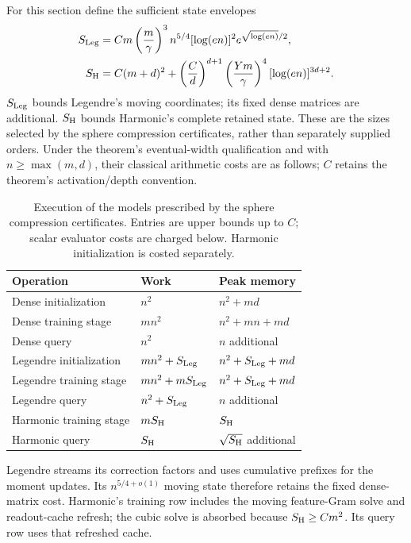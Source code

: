 For this section define the sufficient state envelopes
\begin{align*}
 S_{\rm Leg}&=Cm\left(\frac m\gamma\right)^3
 n^{5/4}[\log(en)]^2e^{\sqrt{\log(en)}/2},\\
 S_{\rm H}&=C(m+d)^2+
 \left(\frac Cd\right)^{d+1}
 \left(\frac{Ym}\gamma\right)^4[\log(en)]^{3d+2}.
\end{align*}
$S_{\rm Leg}$ bounds Legendre's moving coordinates; its fixed dense
matrices are additional. $S_{\rm H}$ bounds Harmonic's complete retained
state. These are the sizes selected by the sphere compression certificates, rather
than separately supplied orders. Under the theorem's eventual-width
qualification and with $n\ge\max(m,d)$, their classical
arithmetic costs are as follows; $C$ retains the theorem's
activation/depth convention.
\begin{table}[htbp]
\centering
\small
\renewcommand{\arraystretch}{1.25}
\begin{tabular}{@{}P{0.23\textwidth}P{0.34\textwidth}P{0.34\textwidth}@{}}
\toprule
Operation & Work & Peak memory\\
\midrule
Dense initialization & $n^2$ & $n^2+md$\\
Dense training stage & $mn^2$ & $n^2+mn+md$\\
Dense query & $n^2$ & $n$ additional\\
\midrule
Legendre initialization & $mn^2+S_{\rm Leg}$ & $n^2+S_{\rm Leg}+md$\\
Legendre training stage & $mn^2+mS_{\rm Leg}$ & $n^2+S_{\rm Leg}+md$\\
Legendre query & $n^2+S_{\rm Leg}$ & $n$ additional\\
\midrule
Harmonic training stage & $mS_{\rm H}$ & $S_{\rm H}$\\
Harmonic query & $S_{\rm H}$ & $\sqrt{S_{\rm H}}$ additional\\
\bottomrule
\end{tabular}
\caption{Execution of the models prescribed by the sphere compression certificates.
Entries are upper bounds up to $C$; scalar evaluator costs are charged
below. Harmonic initialization is costed separately.}
\label{tab:runtime}
\end{table}

Legendre streams its correction factors and uses cumulative prefixes for
the moment updates. Its $n^{5/4+o(1)}$ moving state therefore retains the
fixed dense-matrix cost. Harmonic's training row includes the moving
feature-Gram solve and readout-cache refresh; the cubic solve is absorbed
because $S_{\rm H}\ge Cm^2$. Its query row uses that refreshed cache.

